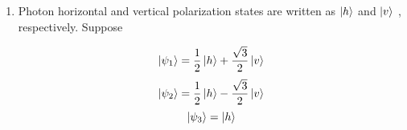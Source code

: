 \documentclass{article}
\begin{document}
\begin{enumerate}
\item Photon horizontal and vertical polarization states are written as $\ket{h}$ and $\ket{v}$ ,
respectively. Suppose

\[ \ket{\psi_{1}}=\frac{1}{2}\ket{h}+\frac{\sqrt{3}}{2}\ket{v} \] 
\[ \ket{\psi_{2}}=\frac{1}{2}\ket{h}-\frac{\sqrt{3}}{2}\ket{v} \] 
\[ \ket{\psi_{3}}=\ket{h} \] 
\end{enumerate}









\end{document}
